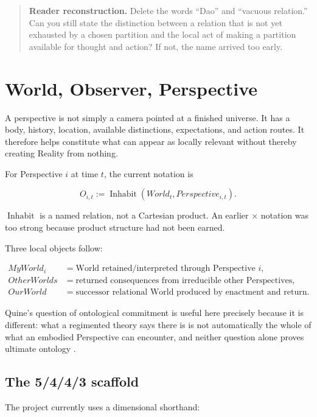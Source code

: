 \documentclass[11pt]{article}
\newenvironment{readercheck}{\begin{quote}\small\noindent\textbf{Reader reconstruction.}\;}{\end{quote}}
\begin{document}
\begin{readercheck}
Delete the words ``Dao'' and ``vacuous relation.'' Can you still state the distinction between a relation that is not yet exhausted by a chosen partition and the local act of making a partition available for thought and action? If not, the name arrived too early.
\end{readercheck}

\section{World, Observer, Perspective}

A perspective is not simply a camera pointed at a finished universe. It has a body, history, location, available distinctions, expectations, and action routes. It therefore helps constitute what can appear as locally relevant without thereby creating Reality from nothing.

For Perspective $i$ at time $t$, the current notation is

\begin{equation}
O_{i,t}:=\operatorname{Inhabit}(World_t,Perspective_{i,t}).
\end{equation}

$\operatorname{Inhabit}$ is a named relation, not a Cartesian product. An earlier $\times$ notation was too strong because product structure had not been earned.

Three local objects follow:

\begin{align}
MyWorld_i &= \text{World retained/interpreted through Perspective }i,\\
OtherWorlds &= \text{returned consequences from irreducible other Perspectives},\\
OurWorld &= \text{successor relational World produced by enactment and return}.
\end{align}

Quine's question of ontological commitment is useful here precisely because it is different: what a regimented theory says there is is not automatically the whole of what an embodied Perspective can encounter, and neither question alone proves ultimate ontology \cite{Quine1948WhatThereIs}.

\subsection{The 5/4/4/3 scaffold}

The project currently uses a dimensional shorthand:
\end{document}
